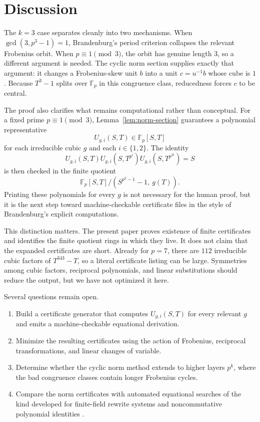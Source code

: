 \section{Discussion}\label{sec:discussion}

The \(k=3\) case separates cleanly into two mechanisms.  When \(\gcd(3,p^3-1)=1\), Brandenburg's period criterion collapses the relevant Frobenius orbit.  When \(p\equiv 1 \pmod 3\), the orbit has genuine length \(3\), so a different argument is needed.  The cyclic norm section supplies exactly that argument: it changes a Frobenius-skew unit \(b\) into a unit \(c=u^{-1}b\) whose cube is \(1\).  Because \(T^3-1\) splits over \(\mathbb F_p\) in this congruence class, reducedness forces \(c\) to be central.

The proof also clarifies what remains computational rather than conceptual.  For a fixed prime \(p\equiv 1 \pmod 3\), Lemma~\ref{lem:norm-section} guarantees a polynomial representative
\[
  U_{g,i}(S,T)\in \mathbb F_p[S,T]
\]
for each irreducible cubic \(g\) and each \(i\in\{1,2\}\).  The identity
\[
  U_{g,i}(S,T)U_{g,i}(S,T^{p^i})U_{g,i}(S,T^{p^{2i}})=S
\]
is then checked in the finite quotient
\[
  \mathbb F_p[S,T]/(S^{p^3-1}-1,\ g(T)).
\]
Printing these polynomials for every \(g\) is not necessary for the human proof, but it is the next step toward machine-checkable certificate files in the style of Brandenburg's explicit computations.

This distinction matters.  The present paper proves existence of finite certificates and identifies the finite quotient rings in which they live.  It does not claim that the expanded certificates are short.  Already for \(p=7\), there are \(112\) irreducible cubic factors of \(T^{343}-T\), so a literal certificate listing can be large.  Symmetries among cubic factors, reciprocal polynomials, and linear substitutions should reduce the output, but we have not optimized it here.

Several questions remain open.
\begin{enumerate}[leftmargin=*]
  \item Build a certificate generator that computes \(U_{g,i}(S,T)\) for every relevant \(g\) and emits a machine-checkable equational derivation.
  \item Minimize the resulting certificates using the action of Frobenius, reciprocal transformations, and linear changes of variable.
  \item Determine whether the cyclic norm method extends to higher layers \(p^k\), where the bad congruence classes contain longer Frobenius cycles.
  \item Compare the norm certificates with automated equational searches of the kind developed for finite-field rewrite systems and noncommutative polynomial identities \cite{burrisLawrence1991,wavrik1999}.
\end{enumerate}
